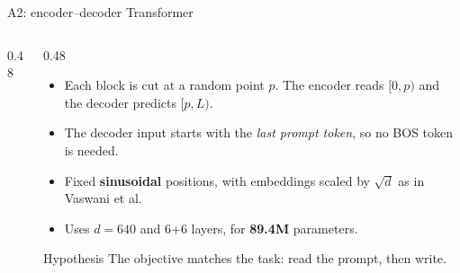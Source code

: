 \documentclass[aspectratio=169,11pt]{beamer}
\begin{document}
\begin{frame}{A2: encoder--decoder Transformer}
  \begin{columns}[T]
    \begin{column}{0.48\textwidth}
      \centering
    \end{column}
    \begin{column}{0.48\textwidth}
      \small
      \begin{itemize}
        \item Each block is cut at a random point $p$. The encoder reads $[0,p)$ and the decoder predicts $[p,L)$.
        \item The decoder input starts with the \emph{last prompt token}, so no BOS token is needed.
        \item Fixed \textbf{sinusoidal} positions, with embeddings scaled by $\sqrt{d}$ as in Vaswani et al.
        \item Uses $d=640$ and 6+6 layers, for \textbf{89.4M} parameters.
      \end{itemize}
      \begin{exampleblock}{Hypothesis}
        \small
        The objective matches the task: read the prompt, then write.
      \end{exampleblock}
    \end{column}
  \end{columns}
\end{frame}
\end{document}
